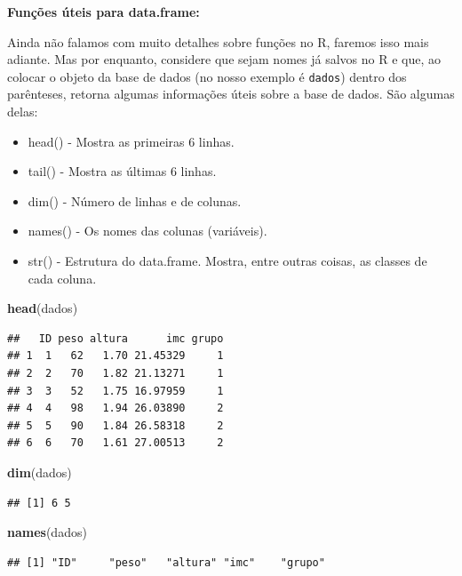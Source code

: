 \documentclass[
]{book}
\newenvironment{Shaded}{\begin{snugshade}}{\end{snugshade}}
\newcommand{\KeywordTok}[1]{\textcolor[rgb]{0.13,0.29,0.53}{\textbf{#1}}}
\newcommand{\NormalTok}[1]{#1}
\begin{document}
\textbf{Funções úteis para data.frame:}

Ainda não falamos com muito detalhes sobre funções no R, faremos isso mais adiante. Mas por enquanto, considere que sejam nomes já salvos no R e que, ao colocar o objeto da base de dados (no nosso exemplo é \texttt{dados}) dentro dos parênteses, retorna algumas informações úteis sobre a base de dados. São algumas delas:

\begin{itemize}
\item
  head() - Mostra as primeiras 6 linhas.
\item
  tail() - Mostra as últimas 6 linhas.
\item
  dim() - Número de linhas e de colunas.
\item
  names() - Os nomes das colunas (variáveis).
\item
  str() - Estrutura do data.frame. Mostra, entre outras coisas, as classes de cada coluna.
\end{itemize}

\begin{Shaded}
\begin{Highlighting}[]
\KeywordTok{head}\NormalTok{(dados)}
\end{Highlighting}
\end{Shaded}

\begin{verbatim}
##   ID peso altura      imc grupo
## 1  1   62   1.70 21.45329     1
## 2  2   70   1.82 21.13271     1
## 3  3   52   1.75 16.97959     1
## 4  4   98   1.94 26.03890     2
## 5  5   90   1.84 26.58318     2
## 6  6   70   1.61 27.00513     2
\end{verbatim}

\begin{Shaded}
\begin{Highlighting}[]
\KeywordTok{dim}\NormalTok{(dados)}
\end{Highlighting}
\end{Shaded}

\begin{verbatim}
## [1] 6 5
\end{verbatim}

\begin{Shaded}
\begin{Highlighting}[]
\KeywordTok{names}\NormalTok{(dados)}
\end{Highlighting}
\end{Shaded}

\begin{verbatim}
## [1] "ID"     "peso"   "altura" "imc"    "grupo"
\end{verbatim}
\end{document}
